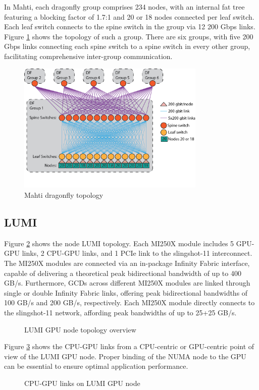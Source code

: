 In Mahti, each dragonfly group comprises 234 nodes, with an internal fat tree featuring a blocking factor of 1.7:1 and 20 or 18 nodes connected per leaf switch. Each leaf switch connects to the spine switch in the group via 12 200 Gbps links. Figure \ref{fig_mahti_df} shows the topology of such a group. There are six groups, with five 200 Gbps links connecting each spine switch to a spine switch in every other group, facilitating comprehensive inter-group communication.

\begin{figure}[H]
    \centering
    \includegraphics[width=0.8\textwidth]{figures/mahti_df.png}
    \caption{Mahti dragonfly topology \cite{mahti}}
    \label{fig_mahti_df}
\end{figure}

\subsection{LUMI}
Figure \ref{fig_lumig_topology} shows the node LUMI topology. Each MI250X module includes 5 GPU-GPU links, 2 CPU-GPU links, and 1 PCIe link to the slingshot-11 interconnect. The MI250X modules are connected via an in-package Infinity Fabric interface, capable of delivering a theoretical peak bidirectional bandwidth of up to 400 GB/s. Furthermore, GCDs across different MI250X modules are linked through single or double Infinity Fabric links, offering peak bidirectional bandwidths of 100 GB/s and 200 GB/s, respectively. Each MI250X module directly connects to the slingshot-11 network, affording peak bandwidths of up to 25+25 GB/s. 

\begin{figure}[H]
    \centering
    \caption{LUMI GPU node topology overview \cite{lumi}}
    \label{fig_lumig_topology}
\end{figure}

Figure \ref{fig_lumig_cpu_gpu_links} shows the CPU-GPU links from a CPU-centric or GPU-centric point of view of the LUMI GPU node. Proper binding of the NUMA node to the GPU can be essential to ensure optimal application performance.

\begin{figure}[H]
    \centering
    \caption{CPU-GPU links on LUMI GPU node \cite{lumi}}
    \label{fig_lumig_cpu_gpu_links}
\end{figure}
